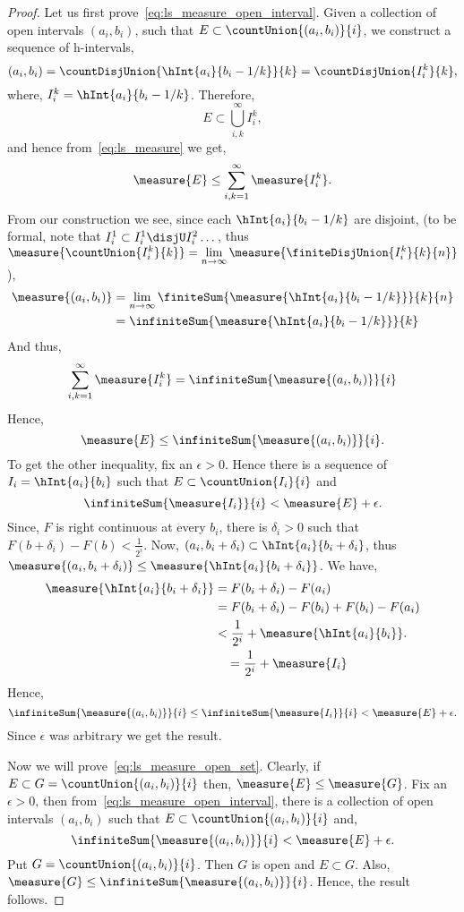 \begin{proof}
    Let us first prove~\ref{eq:ls_measure_open_interval}. Given a collection of open intervals
    $(a_i,b_i)$, such that $E \subset \countUnion{(a_i,b_i)}{i}$, we construct a sequence of
    h-intervals,
    \[(a_i,b_i) = \countDisjUnion{\hInt{a_i}{b_i - 1/k}}{k} = \countDisjUnion{I_i^k}{k},\] 
    where, $I_i^k = \hInt{a_i}{b_i - 1/k}$. Therefore,
    \[E \subset \bigcup\limits_{i,k}^{\infty}I_i^k,\] and hence from~\ref{eq:ls_measure} we get,
    \[\measure{E} \leq \sum\limits_{i,k = 1}^{\infty}\measure{I_i^k}.\]
     From our construction we see, since each $\hInt{a_i}{b_i-1/k}$ are disjoint,
     (to be formal, note that $I_i^1 \subset I_i^1 \disjU I_i^2 \dots$, thus
     $\measure{\countUnion{I_i^k}{k}} =
     \lim\limits_{n\to\infty}\measure{\finiteDisjUnion{I_i^k}{k}{n}}$),
    \begin{align*}
	\measure{(a_i,b_i)} &= \lim\limits_{n\to\infty}\finiteSum{\measure{\hInt{a_i}{b_i -
		    1/k}}}{k}{n} \\
	&= \infiniteSum{\measure{\hInt{a_i}{b_i - 1/k}}}{k}
    \end{align*}
    And thus,
    \[\sum\limits_{i,k = 1}^{\infty}\measure{I_i^k} = \infiniteSum{\measure{(a_i,b_i)}}{i}\]
    Hence,
    \[ \measure{E} \leq \infiniteSum{\measure{(a_i,b_i)}}{i}.\]
    To get the other inequality, fix an $\epsilon > 0$. Hence there is a sequence of $I_i =
    \hInt{a_i}{b_i}$ such that $E \subset \countUnion{I_i}{i}$ and
    \[\infiniteSum{\measure{I_i}}{i} < \measure{E} + \epsilon.\] 
     Since, $F$ is right continuous at every $b_i$, there is $\delta_i > 0$ such that
     $F(b+\delta_i)-F(b) < \frac{1}{2^i}$. Now, 
     $(a_i,b_i + \delta_i) \subset \hInt{a_i}{b_i + \delta_i}$, thus 
     $\measure{(a_i,b_i+\delta_i)} \leq \measure{\hInt{a_i}{b_i+\delta_i}}$. We have,
     \begin{align*}
	 \measure{\hInt{a_i}{b_i+\delta_i}} &= F(b_i+\delta_i) - F(a_i) \\
	 &= F(b_i + \delta_i) - F(b_i) + F(b_i) - F(a_i) \\
	 &< \frac{1}{2^i} + \measure{\hInt{a_i}{b_i}}. \\
	 &\quad = \frac{1}{2^i} + \measure{I_i}
     \end{align*}
     Hence,
     \[\infiniteSum{\measure{(a_i,b_i)}}{i} \leq \infiniteSum{\measure{I_i}}{i} <
	 \measure{E} + \epsilon. \]
     Since $\epsilon$ was arbitrary we get the result.

     Now we will prove~\ref{eq:ls_measure_open_set}. Clearly, 
     if $E \subset G = \countUnion{(a_i,b_i)}{i}$ then, 
     $\measure{E} \leq \measure{G}$. Fix an $\epsilon > 0$, then from~\ref{eq:ls_measure_open_interval}, there
     is a collection of open intervals $(a_i,b_i)$ such that $E \subset \countUnion{(a_i,b_i)}{i}$
     and,
     \[\infiniteSum{\measure{(a_i,b_i)}}{i} < \measure{E} + \epsilon.\]
     Put $G = \countUnion{(a_i,b_i)}{i}$. Then $G$ is open and $E \subset {G}$. Also, $\measure{G}
     \leq \infiniteSum{\measure{(a_i,b_i)}}{i}$. Hence, the result follows.


\end{proof}
